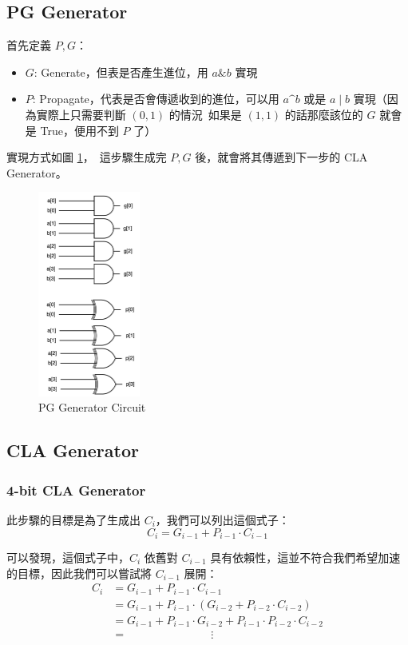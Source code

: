 \documentclass[10.5pt,compsoc,UTF8]{CjC}
\theoremstyle{mystyle}
\begin{document}
\subsection{PG Generator}
首先定義 $P, G$：
\begin{itemize}
  \item $G$: Generate，但表是否產生進位，用 $a \& b$ 實現
  \item $P$: Propagate，代表是否會傳遞收到的進位，可以用 $a \^{} b$ 或是 $a \mid b$ 實現（因為實際上只需要判斷 $(0, 1)$ 的情況\
            如果是 $(1, 1)$ 的話那麼該位的 $G$ 就會是 True，便用不到 $P$ 了）
\end{itemize}

實現方式如圖 \ref{fig:PG_Gen}，\
這步驟生成完 $P, G$ 後，就會將其傳遞到下一步的 CLA Generator。

\begin{figure}[htp]
  \centering
  \includegraphics[width=0.3\textwidth]{PG_Gen.png}
  \caption{PG Generator Circuit}
  \label{fig:PG_Gen}
\end{figure}

\newpage

\subsection{CLA Generator}

\subsubsection*{4-bit CLA Generator}
此步驟的目標是為了生成出 $C_i$，我們可以列出這個式子：
$$C_i = G_{i - 1} + P_{i - 1} \cdot C_{i - 1}$$

可以發現，這個式子中，$C_i$ 依舊對 $C_{i - 1}$ 具有依賴性，這並不符合我們希望加速的目標，因此我們可以嘗試將 $C_{i - 1}$ 展開：
\begin{align*}
  C_i &= G_{i - 1} + P_{i - 1} \cdot C_{i - 1} \\
      &= G_{i - 1} + P_{i - 1} \cdot (G_{i - 2} + P_{i - 2} \cdot C_{i - 2}) \\
      &= G_{i - 1} + P_{i - 1} \cdot G_{i - 2} + P_{i - 1} \cdot P_{i - 2} \cdot C_{i - 2} \\
      &= \ \ \ \ \ \ \ \ \ \ \ \ \ \ \ \ \ \ \ \ \ \ \ \ \ \ \ \ \ \ \ \ \ \ \vdots
\end{align*}
\end{document}
